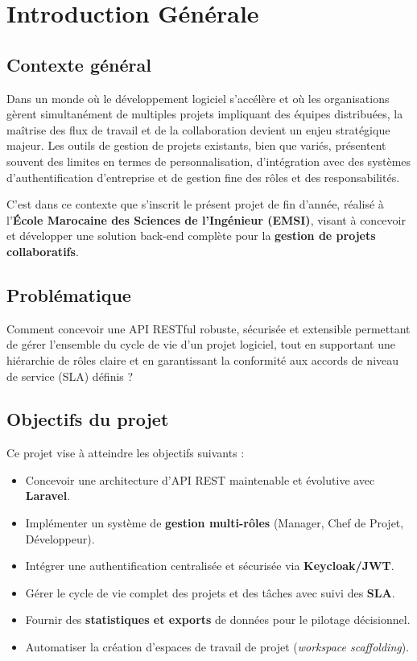 \chapter*{Introduction Générale}
\thispagestyle{fancy}

\section*{Contexte général}

Dans un monde où le développement logiciel s'accélère et où les organisations gèrent
simultanément de multiples projets impliquant des équipes distribuées, la maîtrise des
flux de travail et de la collaboration devient un enjeu stratégique majeur. Les outils
de gestion de projets existants, bien que variés, présentent souvent des limites en
termes de personnalisation, d'intégration avec des systèmes d'authentification d'entreprise
et de gestion fine des rôles et des responsabilités.

C'est dans ce contexte que s'inscrit le présent projet de fin d'année, réalisé
à l'\textbf{École Marocaine des Sciences de l'Ingénieur (EMSI)}, visant à concevoir
et développer une solution back-end complète pour la \textbf{gestion de projets collaboratifs}.

\section*{Problématique}

Comment concevoir une API RESTful robuste, sécurisée et extensible permettant
de gérer l'ensemble du cycle de vie d'un projet logiciel, tout en supportant
une hiérarchie de rôles claire et en garantissant la conformité aux accords
de niveau de service (SLA) définis ?

\section*{Objectifs du projet}

Ce projet vise à atteindre les objectifs suivants :

\begin{itemize}[leftmargin=*, label=\textcolor{emsiRed}{}]
  \item Concevoir une architecture d'API REST maintenable et évolutive avec \textbf{Laravel}.
  \item Implémenter un système de \textbf{gestion multi-rôles} (Manager, Chef de Projet, Développeur).
  \item Intégrer une authentification centralisée et sécurisée via \textbf{Keycloak/JWT}.
  \item Gérer le cycle de vie complet des projets et des tâches avec suivi des \textbf{SLA}.
  \item Fournir des \textbf{statistiques et exports} de données pour le pilotage décisionnel.
  \item Automatiser la création d'espaces de travail de projet (\textit{workspace scaffolding}).
\end{itemize}

